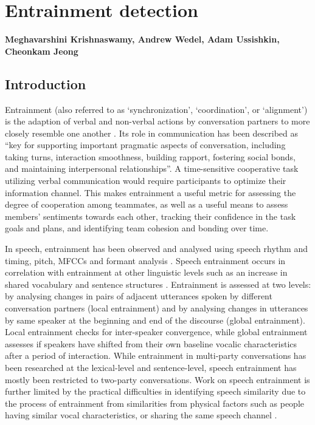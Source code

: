 \chapter{Entrainment detection}
\label{ch:entrainment}

\textbf{Meghavarshini Krishnaswamy, Andrew Wedel, Adam Ussishkin, Cheonkam Jeong} 
\section{Introduction}

    Entrainment (also referred to as `synchronization', `coordination', or `alignment') is the adaption of verbal and non-verbal actions by conversation partners to more closely resemble one another \parencite{borrie2014}. Its role in communication has been described as ``key for supporting important pragmatic aspects of conversation, including taking turns, interaction smoothness, building rapport, fostering social bonds, and maintaining interpersonal relationships''\parencite{borrie2019}. A time-sensitive cooperative task utilizing verbal communication would require participants to optimize their information channel. This makes entrainment a useful metric for assessing the degree of cooperation among teammates, as well as a useful means to assess members' sentiments towards each other, tracking their confidence in the task goals and plans, and identifying team cohesion and bonding over time.

    In speech, entrainment has been observed and analysed using speech rhythm and
    timing, pitch, MFCCs and formant analysis \parencite{reichel2018prosodic,borrie2019syncing}. Speech entrainment occurs in correlation with entrainment at other linguistic levels such as an increase in shared vocabulary and sentence structures \parencite{rahimi2017entrainment}. Entrainment is assessed at two levels: by analysing changes in pairs of adjacent utterances spoken by different conversation partners (local entrainment) and by analysing changes in utterances by same speaker at the beginning and end of the discourse (global entrainment). Local entrainment checks for inter-speaker convergence, while global entrainment assesses if speakers have shifted from their own baseline vocalic characteristics after a period of interaction. While entrainment in multi-party conversations has been researched at the lexical-level and sentence-level, speech entrainment has mostly been restricted to two-party conversations. Work on speech entrainment is further limited by the practical difficulties in identifying speech similarity due to the process of entrainment from similarities from physical factors such as people having similar vocal characteristics, or sharing the same speech channel \parencite{nasir2020}.
    
